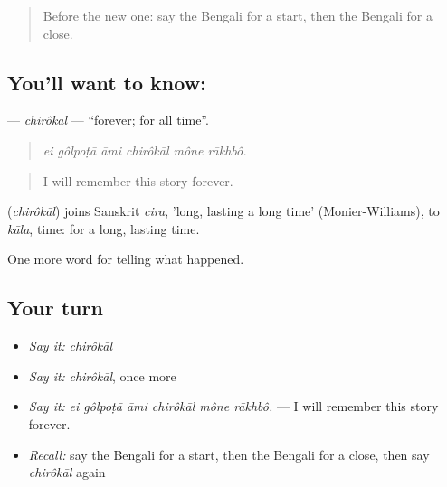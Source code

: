 \label{lesson:BN-C329-chirokal}



\begin{quote}
Before the new one: say the Bengali for a start, then the Bengali for a close.
\end{quote}

\subsection*{You'll want to know: }
\textbf{} — \emph{chirôkāl} — \textquotedblleft{}forever; for all time\textquotedblright{}.

\begin{quote}
     
\end{quote}

\begin{quote}
\emph{ei gôlpoṭā āmi chirôkāl mône rākhbô.}
\end{quote}

\begin{quote}
I will remember this story forever.
\end{quote}

\begin{cousinweb}
\textbf{} (\emph{chirôkāl}) joins Sanskrit \emph{cira}, 'long, lasting a long time' (Monier-Williams), to \emph{kāla}, time: for a long, lasting time.
\end{cousinweb}

\begin{grammarlens}[title={What you've built}]
One more word for telling what happened.
\end{grammarlens}

\subsection*{Your turn}
\begin{itemize}
\raggedright
  \item \emph{Say it:} \emph{chirôkāl}
  \item \emph{Say it:} \emph{chirôkāl}, once more
  \item \emph{Say it:} \emph{ei gôlpoṭā āmi chirôkāl mône rākhbô.} — I will remember this story forever.
  \item \emph{Recall:} say the Bengali for a start, then the Bengali for a close, then say \emph{chirôkāl} again
\end{itemize}


